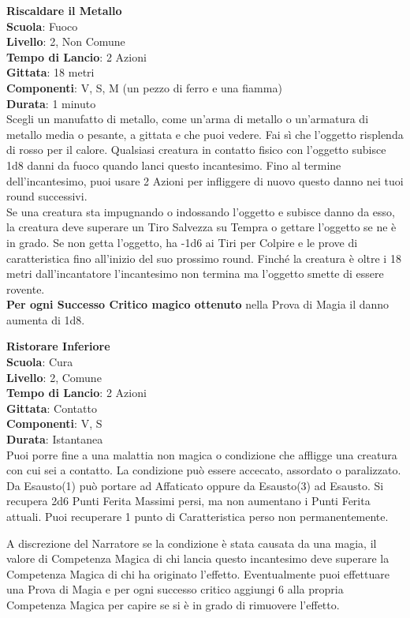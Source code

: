\begin{multicols}{2}
\medskip\textbf{Riscaldare il Metallo}\\
\textbf{Scuola}: Fuoco\\
\textbf{Livello}: 2, Non Comune\\
\textbf{Tempo di Lancio}: 2 Azioni\\
\textbf{Gittata}: 18 metri\\
\textbf{Componenti}: V, S, M (un pezzo di ferro e una fiamma)\\
\textbf{Durata}: 1 minuto\\
Scegli un manufatto di metallo, come un'arma di metallo o un'armatura di metallo media o pesante, a gittata e che puoi vedere. Fai sì che l'oggetto risplenda di rosso per il calore. Qualsiasi creatura in contatto fisico con l'oggetto subisce 1d8 danni da fuoco quando lanci questo incantesimo. Fino al termine dell'incantesimo, puoi usare 2 Azioni per infliggere di nuovo questo danno nei tuoi round successivi.\\
Se una creatura sta impugnando o indossando l'oggetto e subisce danno da esso, la creatura deve superare un Tiro Salvezza su Tempra o gettare l'oggetto se ne è in grado. Se non getta l'oggetto, ha -1d6 ai Tiri per Colpire e le prove di caratteristica fino all'inizio del suo prossimo round. Finché la creatura è oltre i 18 metri dall'incantatore l'incantesimo non termina ma l'oggetto smette di essere rovente.\\
\textbf{Per ogni Successo Critico magico ottenuto} nella Prova di Magia il danno aumenta di 1d8.

\medskip\textbf{Ristorare Inferiore}\\
\textbf{Scuola}: Cura\\
\textbf{Livello}: 2, Comune\\
\textbf{Tempo di Lancio}: 2 Azioni\\
\textbf{Gittata}: Contatto\\
\textbf{Componenti}: V, S\\
\textbf{Durata}: Istantanea\\
Puoi porre fine a una malattia non magica o condizione che affligge una creatura con cui sei a contatto. La condizione può essere accecato, assordato o paralizzato. Da Esausto(1) può portare ad Affaticato oppure da Esausto(3) ad Esausto. Si recupera 2d6 Punti Ferita Massimi persi, ma non aumentano i Punti Ferita attuali. Puoi recuperare 1 punto di Caratteristica perso non permanentemente.

A discrezione del Narratore se la condizione è stata causata da una magia, il valore di Competenza Magica di chi lancia questo incantesimo deve superare la Competenza Magica di chi ha originato l'effetto.
Eventualmente puoi effettuare una Prova di Magia e per ogni successo critico aggiungi 6 alla propria Competenza Magica per capire se si è in grado di rimuovere l'effetto.


\end{multicols}
